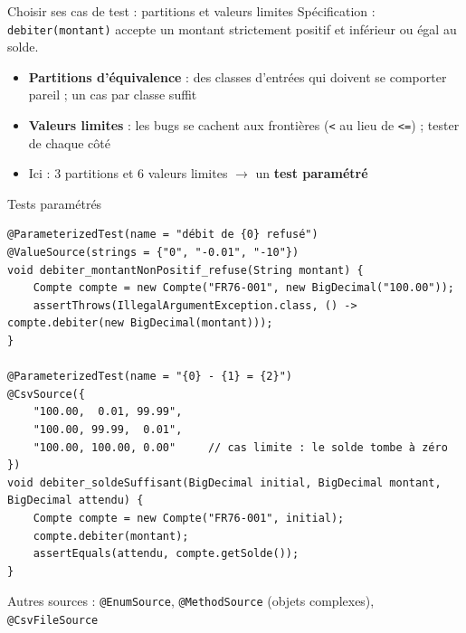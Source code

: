 \documentclass[aspectratio=169,10pt]{beamer}
\begin{document}
\begin{frame}{Choisir ses cas de test : partitions et valeurs limites}
  Spécification : \texttt{debiter(montant)} accepte un montant strictement positif et inférieur ou égal au solde.
  \vspace{2mm}
  \begin{center}
  \end{center}
  \begin{itemize}
    \item \textbf{Partitions d'équivalence} : des classes d'entrées qui doivent se comporter pareil ; un cas par classe suffit
    \item \textbf{Valeurs limites} : les bugs se cachent aux frontières (\texttt{<} au lieu de \texttt{<=}) ; tester de chaque côté
    \item Ici : 3 partitions et 6 valeurs limites $\rightarrow$ un \textbf{test paramétré}
  \end{itemize}
\end{frame}

\begin{frame}[fragile]{Tests paramétrés}
\begin{lstlisting}[basicstyle=\lstcode\scriptsize]
@ParameterizedTest(name = "débit de {0} refusé")
@ValueSource(strings = {"0", "-0.01", "-10"})
void debiter_montantNonPositif_refuse(String montant) {
    Compte compte = new Compte("FR76-001", new BigDecimal("100.00"));
    assertThrows(IllegalArgumentException.class, () -> compte.debiter(new BigDecimal(montant)));
}

@ParameterizedTest(name = "{0} - {1} = {2}")
@CsvSource({
    "100.00,  0.01, 99.99",
    "100.00, 99.99,  0.01",
    "100.00, 100.00, 0.00"     // cas limite : le solde tombe à zéro
})
void debiter_soldeSuffisant(BigDecimal initial, BigDecimal montant, BigDecimal attendu) {
    Compte compte = new Compte("FR76-001", initial);
    compte.debiter(montant);
    assertEquals(attendu, compte.getSolde());
}
\end{lstlisting}
  \small Autres sources : \texttt{@EnumSource}, \texttt{@MethodSource} (objets complexes), \texttt{@CsvFileSource}
\end{frame}
\end{document}
